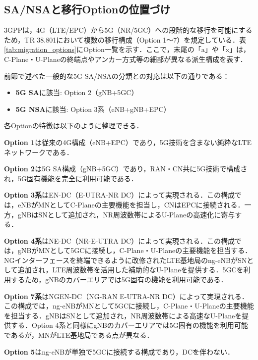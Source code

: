 \subsection{SA/NSAと移行Optionの位置づけ}
\label{sec:sa_nsa_options}
3GPPは，4G（LTE/EPC）から5G（NR/5GC）への段階的な移行を可能にするため，TR 38.801において複数の移行構成（Option 1〜7）を規定している\cite{3GPP_TR38801}．表\ref{tab:migration_options}にOption一覧を示す．ここで，末尾の「a」や「x」は，C-Plane・U-Planeの終端点やアンカー方式等の細部が異なる派生構成を表す．

前節で述べた一般的な5G SA/NSAの分類との対応は以下の通りである：
\begin{itemize}
  \item \textbf{5G SA}に該当: Option 2（gNB+5GC）
  \item \textbf{5G NSA}に該当: Option 3系（eNB+gNB+EPC）
\end{itemize}

各Optionの特徴は以下のように整理できる．

\textbf{Option 1}は従来の4G構成（eNB+EPC）であり，5G技術を含まない純粋なLTEネットワークである．

\textbf{Option 2}は5G SA構成（gNB+5GC）であり，RAN・CN共に5G技術で構成され，5G固有機能を完全に利用可能である．

\textbf{Option 3系}はEN-DC（E-UTRA-NR DC）によって実現される．この構成では，eNBがMNとしてC-Planeの主要機能を担当し，CNはEPCに接続される．一方，gNBはSNとして追加され，NR周波数帯によるU-Planeの高速化に寄与する．

\textbf{Option 4系}はNE-DC（NR-E-UTRA DC）によって実現される．この構成では，gNBがMNとして5GCに接続し，C-Plane・U-Planeの主要機能を担当する．NGインターフェースを終端できるように改修されたLTE基地局のng-eNBがSNとして追加され，LTE周波数帯を活用した補助的なU-Planeを提供する．5GCを利用するため，gNBのカバーエリアでは5G固有の機能を利用可能である．

\textbf{Option 7系}はNGEN-DC（NG-RAN E-UTRA-NR DC）によって実現される．この構成では，ng-eNBがMNとして5GCに接続し，C-Plane・U-Planeの主要機能を担当する．gNBはSNとして追加され，NR周波数帯による高速なU-Planeを提供する．Option 4系と同様にgNBのカバーエリアでは5G固有の機能を利用可能であるが，MNがLTE基地局である点が異なる．

\textbf{Option 5}はng-eNBが単独で5GCに接続する構成であり，DCを伴わない．

